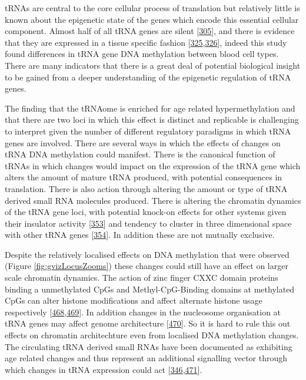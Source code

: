 \documentclass[
]{book}
\begin{document}
tRNAs are central to the core cellular process of translation but relatively little is known about the epigenetic state of the genes which encode this essential cellular component.
Almost half of all tRNA genes are silent {[}\protect\hyperlink{ref-Torres2019a}{305}{]}, and there is evidence that they are expressed in a tissue specific fashion {[}\protect\hyperlink{ref-Dittmar2006}{325},\protect\hyperlink{ref-Sagi2016}{326}{]}, indeed this study found differences in tRNA gene DNA methylation between blood cell types.
There are many indicators that there is a great deal of potential biological insight to be gained from a deeper understanding of the epigenetic regulation of tRNA genes.

The finding that the tRNAome is enriched for age related hypermethylation and that there are two loci in which this effect is distinct and replicable is challenging to interpret given the number of different regulatory paradigms in which tRNA genes are involved.
There are several ways in which the effects of changes on tRNA DNA methylation could manifest.
There is the canonical function of tRNAs in which changes would impact on the expression of the tRNA gene which alters the amount of mature tRNA produced, with potential consequences in translation.
There is also action through altering the amount or type of tRNA derived small RNA molecules produced.
There is altering the chromatin dynamics of the tRNA gene loci, with potential knock-on effects for other systems given their insulator activity {[}\protect\hyperlink{ref-Raab2011}{353}{]} and tendency to cluster in three dimensional space with other tRNA genes {[}\protect\hyperlink{ref-VanBortle2017}{354}{]}.
In addition these are not mutually exclusive.

Despite the relatively localised effects on DNA methylation that were observed (Figure \ref{fig:gvizLocusZooms}) these changes could still have an effect on larger scale chromatin dynamics. The action of zinc finger CXXC domain proteins binding a unmethylated CpGs and Methyl-CpG-Binding domains at methylated CpGs can alter histone modifications and affect alternate histone usage respectively {[}\protect\hyperlink{ref-Blackledge2013}{468},\protect\hyperlink{ref-Sijacic2019}{469}{]}.
In addition changes in the nucleosome organisation at tRNA genes may affect genome architecture {[}\protect\hyperlink{ref-Hamdani2019}{470}{]}.
So it is hard to rule this out effects on chromatin architechture even from localised DNA methylation changes.
The circulating tRNA derived small RNAs have been documented as exhibiting age related changes and thus represent an additional signalling vector through which changes in tRNA expression could act {[}\protect\hyperlink{ref-Dhahbi2013}{346},\protect\hyperlink{ref-Rounge2018}{471}{]}.
\end{document}
